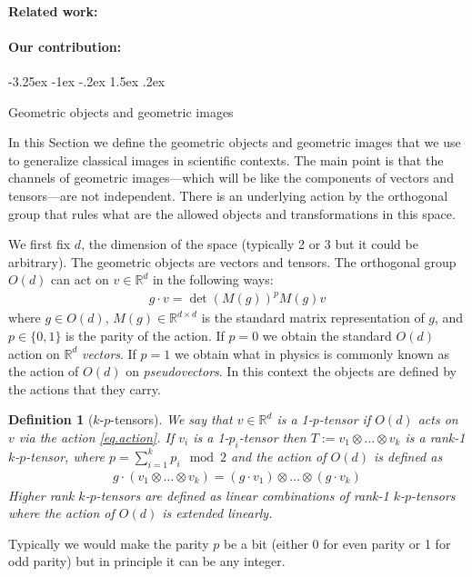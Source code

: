 \documentclass{article}
\makeatletter
\theoremstyle{plain}
\newtheorem{definition}{Definition}
\newcommand{\sectionname}{Section}
\renewcommand\section{\@startsection {section}{1}{\z@}%
  {-3.25ex \@plus -1ex \@minus -.2ex}%
  {1.5ex \@plus .2ex}%
  {\raggedright\normalfont\large\bfseries}}%
\makeatother
\begin{document}
\paragraph{Related work:}

\paragraph{Our contribution:}

\section{Geometric objects and geometric images}\label{sec:geometric}

In this \sectionname{} we define the geometric objects and geometric images that we use to generalize classical images in scientific contexts.
The main point is that the channels of geometric images---which will be like the components of vectors and tensors---are not independent.
There is an underlying action by the orthogonal group that rules what are the allowed objects and transformations in this space.

We first fix $d$, the dimension of the space (typically 2 or 3 but it could be arbitrary). The geometric objects are vectors and tensors. 
The orthogonal group $O(d)$ can act on $v \in \mathbb R^d$ in the following ways:
\begin{align} \label{eq.action}
    g\cdot v = \det(M(g))^p M(g) v 
\end{align}
where $g\in O(d)$, $M(g)\in \mathbb R^{d\times d}$ is the standard matrix representation of $g$, and $p\in\{0,1\}$ is the parity of the action. If $p=0$ we obtain the standard $O(d)$ action on $\mathbb R^d$ \emph{vectors}. If $p=1$ we obtain what in physics is commonly known as the action of $O(d)$ on \emph{pseudovectors}. In this context the objects are defined by the actions that they carry.

\begin{definition}[$k$-$p$-tensors]\label{def.tensors}
We say that $v\in \mathbb R^d$ is a 1-$p$-tensor if $O(d)$ acts on $v$ via the action \eqref{eq.action}. 
If $v_i$ is a 1-$p_i$-tensor then $T:=v_{1}\otimes\ldots \otimes v_k$ is a rank-1 $k$-$p$-tensor, where $p=\sum_{i=1}^k p_i \mod 2$ and the action of $O(d)$ is defined as
\begin{align}
    g\cdot (v_{1}\otimes\ldots \otimes v_k) = (g\cdot v_1)\otimes \ldots \otimes (g\cdot v_k)
\end{align}
Higher rank $k$-$p$-tensors are defined as linear combinations of rank-1  $k$-$p$-tensors where the action of $O(d)$ is extended linearly.
\end{definition}
Typically we would make the parity $p$ be a bit (either 0 for even parity or 1 for odd parity) but in principle it can be any integer.
\end{document}
